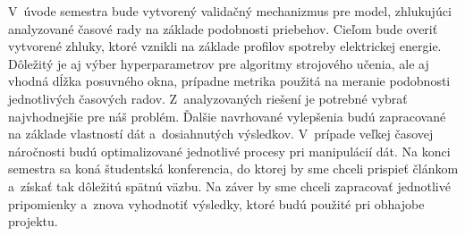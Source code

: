 \documentclass[a4paper,twoside,slovak,12pt,appendix]{article}
\begin{document}
\begin{appendices}
\noindent
V~úvode semestra bude vytvorený validačný mechanizmus pre model, zhlukujúci
analyzované časové rady na základe podobnosti priebehov. Cieľom bude overiť
vytvorené zhluky, ktoré vznikli na základe profilov spotreby elektrickej energie.
Dôležitý je aj výber hyperparametrov pre algoritmy strojového učenia, ale aj
vhodná dĺžka posuvného okna, prípadne metrika použitá na meranie podobnosti
jednotlivých časových radov. Z~analyzovaných riešení je potrebné vybrať
najvhodnejšie pre náš problém. Ďalšie navrhované vylepšenia budú zapracované na
základe vlastností dát a~dosiahnutých výsledkov. V~prípade veľkej časovej
náročnosti budú optimalizované jednotlivé procesy pri manipulácií dát. Na konci
semestra sa koná študentská konferencia, do ktorej by sme chceli prispieť
článkom a~získať tak dôležitú spätnú väzbu. Na záver by sme chceli zapracovať
jednotlivé pripomienky a~znova vyhodnotiť výsledky, ktoré budú použité pri
obhajobe projektu.


\end{appendices}
\end{document}
